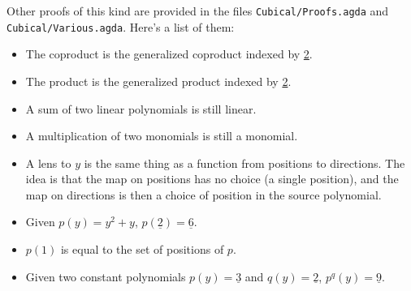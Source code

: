 Other proofs of this kind are provided in the files \texttt{Cubical/Proofs.agda} and 
\texttt{Cubical/Various.agda}. Here's a list of them:
\begin{itemize}
    \item The coproduct is the generalized coproduct indexed by \underline{2}.
    \item The product is the generalized product indexed by \underline{2}.
    \item A sum of two linear polynomials is still linear.
    \item A multiplication of two monomials is still a monomial.
    \item A lens to $y$ is the same thing as a function from positions to directions. The idea is that the map on positions has no choice (a single position), and the map on directions is then a choice of position in the source polynomial.
    \item Given $p(y) = y^2 + y$, $p(\underline{2}) = \underline{6}$.
    \item $p(1)$ is equal to the set of positions of $p$.
    \item Given two constant polynomials $p(y) = \underline{3}$ and $q(y) = \underline{2}$, $p^q(y) = \underline{9}$.
\end{itemize}
